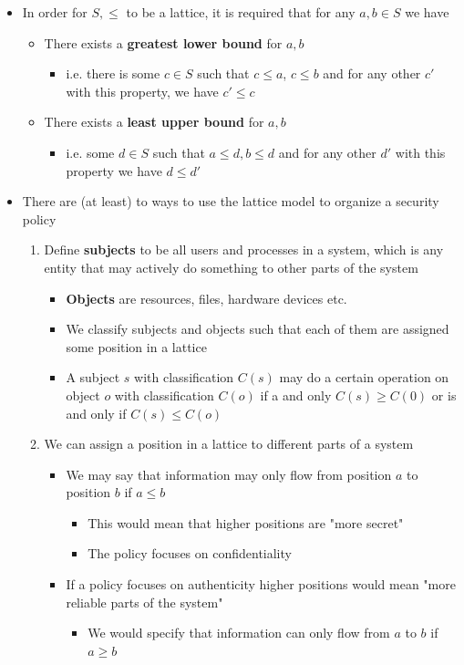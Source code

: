 \documentclass[11pt]{article}
\begin{document}
\begin{itemize}
\item In order for \(S,\leq\) to be a lattice, it is required that for any \(a,b \in S\) we have
\begin{itemize}
\item There exists a \textbf{greatest lower bound} for \(a,b\)
\begin{itemize}
\item i.e. there is some \(c \in S\) such that \(c \leq a\), \(c \leq b\) and for any other \(c'\) with this property, we have \(c' \leq c\)
\end{itemize}
\item There exists a \textbf{least upper bound} for \(a,b\)
\begin{itemize}
\item i.e. some \(d \in S\) such that \(a \leq d, b \leq d\) and for any other \(d'\) with this property we have \(d \leq d'\)
\end{itemize}
\end{itemize}

\item There are (at least) to ways to use the lattice model to organize a security policy
\begin{enumerate}
\item Define \textbf{subjects} to be all users and processes in a system, which is any entity that may actively do something to other parts of the system
\begin{itemize}
\item \textbf{Objects} are resources, files, hardware devices etc.
\item We classify subjects and objects such that each of them are assigned some position in a lattice
\item A subject \(s\) with classification \(C(s)\) may do a certain operation on object \(o\) with classification \(C(o)\) if a and only \(C(s) \geq C(0)\) or is and only if \(C(s) \leq C(o)\)
\end{itemize}
\item We can assign a position in a lattice to different parts of a system
\begin{itemize}
\item We may say that information may only flow from position \(a\) to position \(b\) if \(a \leq b\)
\begin{itemize}
\item This would mean that higher positions are "more secret"
\item The policy focuses on confidentiality
\end{itemize}
\item If a policy focuses on authenticity higher positions would mean "more reliable parts of the system"
\begin{itemize}
\item We would specify that information can only flow from \(a\) to \(b\) if \(a \geq b\)
\end{itemize}
\end{itemize}
\end{enumerate}


\end{itemize}
\end{document}
